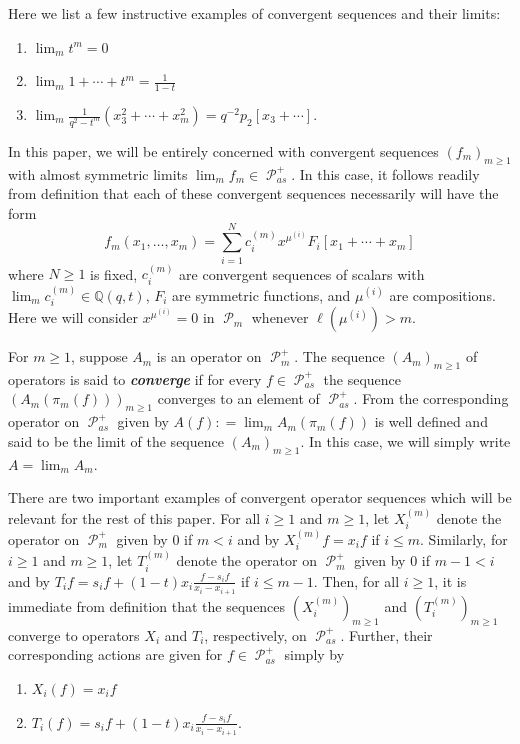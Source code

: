 \documentclass[ALCO,Unicode]{cedram}
\DeclareMathOperator{\sP}{\mathscr{P} }
\begin{document}
Here we list a few instructive examples of convergent sequences and their limits:

\begin{enumerate}
    \item $\lim_{m} t^m = 0$
    \item $\lim_{m} 1+\cdots +t^m = \frac{1}{1-t}$
    \item $\lim_{m} \frac{1}{q^2-t^m}(x_3^2 +\cdots+ x_{m}^2 ) = q^{-2} p_2[x_3+ \cdots].$
\end{enumerate}

\begin{rema}\label{useful defn of convergence}
    In this paper, we will be entirely concerned with convergent sequences $(f_m)_{m \geq 1}$ with almost symmetric limits $\lim_{m} f_m \in \sP_{as}^{+}$. In this case, it follows readily from definition that each of these convergent sequences necessarily will have the form 
    $$f_m(x_1,\ldots,x_m) = \sum_{i=1}^{N} c_i^{(m)}x^{\mu^{(i)}}F_i[x_1+\cdots + x_m]$$
    where $N \geq 1$ is fixed, $c_i^{(m)}$ are convergent sequences of scalars with $\lim_{m} c_i^{(m)} \in \mathbb{Q}(q,t)$, $F_i$ are symmetric functions, and $\mu^{(i)}$ are compositions. Here we will consider $x^{\mu^{(i)}} = 0$ in $\sP_{m}$ whenever $\ell(\mu^{(i)}) > m$.
\end{rema}

\begin{defi}
    For $m \geq 1$, suppose $A_m$ is an operator on $\sP_m^{+}$. The sequence $(A_m)_{m \geq 1}$ of operators is said to \textbf{\textit{converge}} if for every $f \in \sP_{as}^{+}$ the sequence $(A_m(\pi_m(f)))_{m \geq 1}$ converges to an element of $\sP_{as}^{+}$. From \cite{Ion_2022} the corresponding operator on $\sP_{as}^{+}$ given by $A(f): = \lim_{m} A_m(\pi_m(f))$ is well defined and said to be the limit of the sequence $(A_m)_{m \geq 1}$. In this case, we will simply write $A = \lim_{m} A_m$.
\end{defi}

There are two important examples of convergent operator sequences which will be relevant for the rest of this paper. For all $i 
\geq 1$ and $m \geq 1$, let $X_i^{(m)}$ denote the operator on $\sP_m^{+}$ given by $0$ if $m < i$ and by $X_i^{(m)}f = x_i f$ if $i \leq m$. Similarly, for $i \geq 1$ and $m \geq 1$, let $T_i^{(m)}$ denote the operator on $\sP_m^{+}$ given by $0$ if $m-1 < i$ and by $T_if = s_if + (1-t)x_i \frac{f-s_if}{x_i-x_{i+1}}$ if $i \leq m-1$. Then, for all $i \geq 1$, it is immediate from definition that the sequences $(X_i^{(m)})_{m \geq 1}$ and $(T_i^{(m)})_{m \geq 1}$ converge to operators $X_i$ and $T_i$, respectively, on $\sP_{as}^{+}$. Further, their corresponding actions are given for $f \in \sP_{as}^{+}$ simply by 
\begin{enumerate}
    \item $X_i(f) = x_if$
    \item $T_i(f) = s_if + (1-t)x_i \frac{f-s_if}{x_i-x_{i+1}}.$ 
\end{enumerate}
\end{document}
